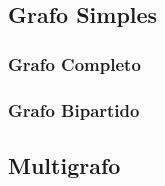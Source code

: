 \subsection{Grafo Simples}
    \subsubsection*{Grafo Completo}
    
    \subsubsection*{Grafo Bipartido}
\subsection{Multigrafo}